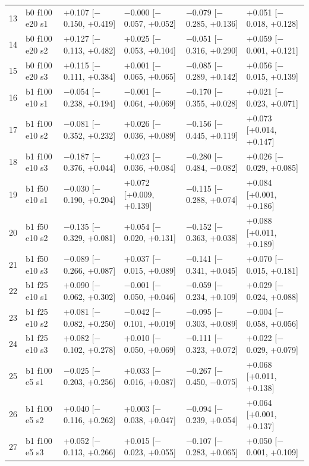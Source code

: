 \documentclass[10pt,a4paper]{article}
\newcommand{\Y}{\cellcolor{red!15}}
\begin{document}
\begin{table}[h]
\begin{tabular}{rlllll}
13 & b0 f100 e20 s1 & +0.107 [$-$0.150, +0.419] & $-$0.000 [$-$0.057, +0.052] & $-$0.079 [$-$0.285, +0.136] & +0.051 [$-$0.018, +0.128]\\
14 & b0 f100 e20 s2 & +0.127 [$-$0.113, +0.482] & +0.025 [$-$0.053, +0.104] & $-$0.051 [$-$0.316, +0.290] & +0.059 [$-$0.001, +0.121]\\
15 & b0 f100 e20 s3 & +0.115 [$-$0.111, +0.384] & +0.001 [$-$0.065, +0.065] & $-$0.085 [$-$0.289, +0.142] & +0.056 [$-$0.015, +0.139]\\
\midrule
16 & b1 f100 e10 s1 & $-$0.054 [$-$0.238, +0.194] & $-$0.001 [$-$0.064, +0.069] & $-$0.170 [$-$0.355, +0.028] & +0.021 [$-$0.023, +0.071]\\
17 & b1 f100 e10 s2 & $-$0.081 [$-$0.352, +0.232] & +0.026 [$-$0.036, +0.089] & $-$0.156 [$-$0.445, +0.119] & \Y +0.073 [+0.014, +0.147]\\
18 & b1 f100 e10 s3 & $-$0.187 [$-$0.376, +0.044] & +0.023 [$-$0.036, +0.084] & \cellcolor{green!12}$-$0.280 [$-$0.484, $-$0.082] & +0.026 [$-$0.029, +0.085]\\
19 & b1 f50 e10 s1 & $-$0.030 [$-$0.190, +0.204] & \Y +0.072 [+0.009, +0.139] & $-$0.115 [$-$0.288, +0.074] & \Y +0.084 [+0.001, +0.186]\\
20 & b1 f50 e10 s2 & $-$0.135 [$-$0.329, +0.081] & +0.054 [$-$0.020, +0.131] & $-$0.152 [$-$0.363, +0.038] & \Y +0.088 [+0.011, +0.189]\\
21 & b1 f50 e10 s3 & $-$0.089 [$-$0.266, +0.087] & +0.037 [$-$0.015, +0.089] & $-$0.141 [$-$0.341, +0.045] & +0.070 [$-$0.015, +0.181]\\
22 & b1 f25 e10 s1 & +0.090 [$-$0.062, +0.302] & $-$0.001 [$-$0.050, +0.046] & $-$0.059 [$-$0.234, +0.109] & +0.029 [$-$0.024, +0.088]\\
23 & b1 f25 e10 s2 & +0.081 [$-$0.082, +0.250] & $-$0.042 [$-$0.101, +0.019] & $-$0.095 [$-$0.303, +0.089] & $-$0.004 [$-$0.058, +0.056]\\
24 & b1 f25 e10 s3 & +0.082 [$-$0.102, +0.278] & +0.010 [$-$0.050, +0.069] & $-$0.111 [$-$0.323, +0.072] & +0.022 [$-$0.029, +0.079]\\
25 & b1 f100 e5 s1 & $-$0.025 [$-$0.203, +0.256] & +0.033 [$-$0.016, +0.087] & \cellcolor{green!12}$-$0.267 [$-$0.450, $-$0.075] & \Y +0.068 [+0.011, +0.138]\\
26 & b1 f100 e5 s2 & +0.040 [$-$0.116, +0.262] & +0.003 [$-$0.038, +0.047] & $-$0.094 [$-$0.239, +0.054] & \Y +0.064 [+0.001, +0.137]\\
27 & b1 f100 e5 s3 & +0.052 [$-$0.113, +0.266] & +0.015 [$-$0.023, +0.055] & $-$0.107 [$-$0.283, +0.065] & +0.050 [$-$0.001, +0.109]\\

\end{tabular}
\end{table}
\end{document}
